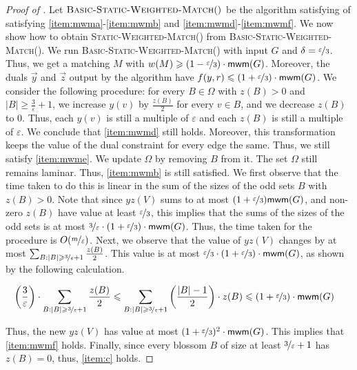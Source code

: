 \documentclass[a4paper,11pt]{article}
\newcommand{\card}[1]{|#1|}
\newcommand{\paren}[1]{\left ( #1 \right )}
\newcommand{\eps}{\varepsilon}
\theoremstyle{definition}
\theoremstyle{definition}
\theoremstyle{definition}
\theoremstyle{definition}
\theoremstyle{definition}
\theoremstyle{definition}
\theoremstyle{definition}
\theoremstyle{definition}
\theoremstyle{definition}
\theoremstyle{definition}
\theoremstyle{definition}
\theoremstyle{definition}
\theoremstyle{definition}
\theoremstyle{definition}
\theoremstyle{definition}
\begin{document}
\begin{proof}[Proof of ]
Let $\textsc{Basic-Static-Weighted-Match}()$ be the algorithm satisfying of \cite{DP14} satisfying \ref{item:mwma}-\ref{item:mwmb} and \ref{item:mwmd}-\ref{item:mwmf}. We now show how to obtain \textsc{Static-Weighted-Match}() from \textsc{Basic-Static-Weighted-Match}(). We run \textsc{Basic-Static-Weighted-Match}() with input $G$ and $\delta=\nicefrac{\eps}{3}$. Thus, we get a matching $M$ with $w(M)\geqslant (1-\nicefrac{\eps}{3})\cdot \textsf{mwm}(G)$. Moreover, the duals $\vec{y}$ and $\vec{z}$ output by the algorithm have $f(y,r)\leqslant (1+\nicefrac{\eps}{3})\cdot \textsf{mwm}(G)$. We consider the following procedure: for every $B\in \Omega$ with $z(B)>0$ and $\card{B}\geqslant \frac{3}{\eps}+1$, we increase $y(v)$ by $\frac{z(B)}{2}$ for every $v\in B$, and we decrease $z(B)$ to $0$. Thus, each $y(v)$ is still a multiple of $\eps$ and each $z(B)$ is still a multiple of $\eps$. We conclude that \ref{item:mwmd} still holds. Moreover, this transformation keeps the value of the dual constraint for every edge the same. Thus, we still satisfy \ref{item:mwme}. We update $\Omega$ by removing $B$ from it. The set $\Omega$ still remains laminar. Thus, \ref{item:mwmb} is still satisfied. We first observe that the time taken to do this is linear in the sum of the sizes of the odd sets $B$ with $z(B)>0$. Note that since $yz(V)$ sums to at most $(1+\nicefrac{\eps}{3})\textsf{mwm}(G)$, and non-zero $z(B)$ have value at least $\nicefrac{\eps}{3}$, this implies that the sums of the sizes of the odd sets is at most $\nicefrac{3}{\eps}\cdot (1+\nicefrac{\eps}{3})\cdot \textsf{mwm}(G)$. Thus, the time taken for the procedure is $O(\nicefrac{m}{\eps})$. Next, we observe that the value of $yz(V)$ changes by at most $\sum_{B:\card{B}\geqslant \nicefrac{3}{\eps}+1}\frac{z(B)}{2}$. This value is at most $\nicefrac{\eps}{3}\cdot (1+\nicefrac{\eps}{3})\cdot \textsf{mwm}(G)$, as shown by the following calculation.
	
	\begin{equation*}
	\begin{split}
		\paren{\frac{3}{\eps}}\cdot \sum_{B:\card{B}\geqslant \nicefrac{3}{\eps}+1}\frac{z(B)}{2}\leqslant \sum_{B:\card{B}\geqslant \nicefrac{3}{\eps}+1}\paren{\frac{\card{B}-1}{2}}\cdot z(B)&\leqslant (1+\nicefrac{\eps}{3})\cdot \textsf{mwm}(G)
	\end{split}
	\end{equation*}
	
	Thus, the new $yz(V)$ has value at most $(1+\nicefrac{\eps}{3})^2\cdot \textsf{mwm}(G)$. This implies that \ref{item:mwmf} holds. Finally, since every blossom $B$ of size at least $\nicefrac{3}{\eps}+1$ has $z(B)=0$, thus, \ref{item:c} holds. 
\end{proof}
\end{document}
